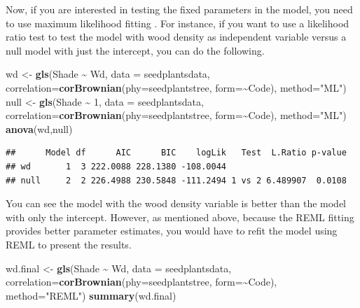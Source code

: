 \documentclass[
]{book}
\newenvironment{Shaded}{\begin{snugshade}}{\end{snugshade}}
\newcommand{\AttributeTok}[1]{\textcolor[rgb]{0.13,0.29,0.53}{#1}}
\newcommand{\DecValTok}[1]{\textcolor[rgb]{0.00,0.00,0.81}{#1}}
\newcommand{\FunctionTok}[1]{\textcolor[rgb]{0.13,0.29,0.53}{\textbf{#1}}}
\newcommand{\NormalTok}[1]{#1}
\newcommand{\OtherTok}[1]{\textcolor[rgb]{0.56,0.35,0.01}{#1}}
\newcommand{\SpecialCharTok}[1]{\textcolor[rgb]{0.81,0.36,0.00}{\textbf{#1}}}
\newcommand{\StringTok}[1]{\textcolor[rgb]{0.31,0.60,0.02}{#1}}
\begin{document}
Now, if you are interested in testing the fixed parameters in the model, you need to use maximum likelihood fitting \citep{zuur2009mixed}. For instance, if you want to use a likelihood ratio test to test the model with wood density as independent variable versus a null model with just the intercept, you can do the following.

\begin{Shaded}
\begin{Highlighting}[]
\NormalTok{wd }\OtherTok{\textless{}{-}} \FunctionTok{gls}\NormalTok{(Shade }\SpecialCharTok{\textasciitilde{}}\NormalTok{ Wd, }\AttributeTok{data =}\NormalTok{ seedplantsdata,}
          \AttributeTok{correlation=}\FunctionTok{corBrownian}\NormalTok{(}\AttributeTok{phy=}\NormalTok{seedplantstree, }\AttributeTok{form=}\SpecialCharTok{\textasciitilde{}}\NormalTok{Code), }
          \AttributeTok{method=}\StringTok{"ML"}\NormalTok{)}
\NormalTok{null }\OtherTok{\textless{}{-}} \FunctionTok{gls}\NormalTok{(Shade }\SpecialCharTok{\textasciitilde{}} \DecValTok{1}\NormalTok{, }\AttributeTok{data =}\NormalTok{ seedplantsdata,}
            \AttributeTok{correlation=}\FunctionTok{corBrownian}\NormalTok{(}\AttributeTok{phy=}\NormalTok{seedplantstree, }\AttributeTok{form=}\SpecialCharTok{\textasciitilde{}}\NormalTok{Code), }
            \AttributeTok{method=}\StringTok{"ML"}\NormalTok{)}
\FunctionTok{anova}\NormalTok{(wd,null)}
\end{Highlighting}
\end{Shaded}

\begin{verbatim}
##      Model df      AIC      BIC    logLik   Test  L.Ratio p-value
## wd       1  3 222.0088 228.1380 -108.0044                        
## null     2  2 226.4988 230.5848 -111.2494 1 vs 2 6.489907  0.0108
\end{verbatim}

You can see the model with the wood density variable is better than the model with only the intercept. However, as mentioned above, because the REML fitting provides better parameter estimates, you would have to refit the model using REML to present the results.

\begin{Shaded}
\begin{Highlighting}[]
\NormalTok{wd.final }\OtherTok{\textless{}{-}} \FunctionTok{gls}\NormalTok{(Shade }\SpecialCharTok{\textasciitilde{}}\NormalTok{ Wd, }\AttributeTok{data =}\NormalTok{ seedplantsdata,}
                \AttributeTok{correlation=}\FunctionTok{corBrownian}\NormalTok{(}\AttributeTok{phy=}\NormalTok{seedplantstree, }\AttributeTok{form=}\SpecialCharTok{\textasciitilde{}}\NormalTok{Code), }
                \AttributeTok{method=}\StringTok{"REML"}\NormalTok{)}
\FunctionTok{summary}\NormalTok{(wd.final)}
\end{Highlighting}
\end{Shaded}
\end{document}
